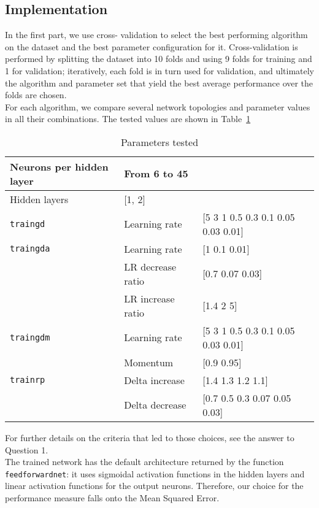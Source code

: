 \documentclass{article}
\begin{document}
\subsection{Implementation}
In the first part, we use cross- validation to select the best performing algorithm on the dataset and the best parameter configuration for it. Cross-validation is performed by splitting the dataset into 10 folds and using 9 folds for training and 1 for validation; iteratively, each fold is in turn used for validation, and ultimately the algorithm and parameter set that yield the best average performance over the folds are chosen.\\
For each algorithm, we compare several network topologies and parameter values in all their combinations. The tested values are shown in Table~\ref{tab:parameters}\\
\begin{table}
	\centering
	\caption{Parameters tested}
	\label{tab:parameters}

		\begin{tabular}{|l|l|l|}
		\hline
		Neurons per hidden layer & \multicolumn{2}{l|}{From 6 to 45} \\\hline
		Hidden layers		& \multicolumn{2}{l|}{[1, 2]} \\\hline
		\verb$traingd$	&	Learning rate		&	[5 3 1 0.5 0.3 0.1 0.05 0.03 0.01] \\\hline
		\verb$traingda$	&	Learning rate & [1 0.1 0.01] \\\cline{2-3}
										& LR decrease ratio	&	[0.7 0.07 0.03] \\\cline{2-3}
										& LR increase ratio & [1.4 2 5]	\\\hline
		\verb$traingdm$	&	Learning rate	&	[5 3 1 0.5 0.3 0.1 0.05 0.03 0.01]	\\\cline{2-3}
										&	Momentum			&	[0.9 0.95]	\\\hline
		\verb$trainrp$	&	Delta increase	&	[1.4 1.3 1.2 1.1]	\\\cline{2-3}
										&	Delta decrease	&	[0.7 0.5 0.3 0.07 0.05 0.03]	\\
		\hline		
		\end{tabular}
\end{table}
For further details on the criteria that led to those choices, see the answer to Question 1.\\
The trained network has the default architecture returned by the function \verb$feedforwardnet$: it uses sigmoidal activation functions in the hidden layers and linear activation functions for the output neurons. Therefore, our choice for the performance measure falls onto the Mean Squared Error.\\
\end{document}
